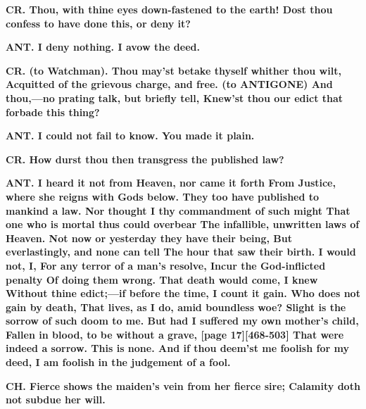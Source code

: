 \documentclass[11pt,letter]{book}
\begin{document}
\par \textbf{CR. Thou, with thine eyes down-fastened to the earth! Dost thou confess to have done this, or deny it?}
\par 

\par \textbf{ANT. I deny nothing. I avow the deed.}
\par 

\par \textbf{CR. (to Watchman). Thou may’st betake thyself whither thou wilt, Acquitted of the grievous charge, and free. (to ANTIGONE) And thou,—no prating talk, but briefly tell, Knew’st thou our edict that forbade this thing?}
\par 

\par \textbf{ANT. I could not fail to know. You made it plain.}
\par 

\par \textbf{CR. How durst thou then transgress the published law?}
\par 

\par \textbf{ANT. I heard it not from Heaven, nor came it forth From Justice, where she reigns with Gods below. They too have published to mankind a law. Nor thought I thy commandment of such might That one who is mortal thus could overbear The infallible, unwritten laws of Heaven. Not now or yesterday they have their being, But everlastingly, and none can tell The hour that saw their birth. I would not, I, For any terror of a man’s resolve, Incur the God-inflicted penalty Of doing them wrong. That death would come, I knew Without thine edict;—if before the time, I count it gain. Who does not gain by death, That lives, as I do, amid boundless woe? Slight is the sorrow of such doom to me. But had I suffered my own mother’s child, Fallen in blood, to be without a grave, [page 17][468-503] That were indeed a sorrow. This is none. And if thou deem’st me foolish for my deed, I am foolish in the judgement of a fool.}
\par 

\par \textbf{CH. Fierce shows the maiden’s vein from her fierce sire; Calamity doth not subdue her will.}
\par 
\end{document}
